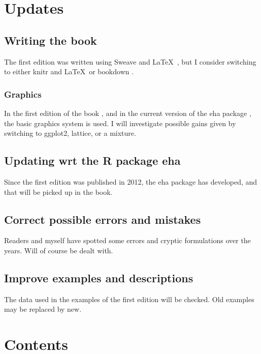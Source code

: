 \documentclass[a4paper,11pt]{article}
\begin{document}
\section{Updates} \label{sec:updates}

\subsection{Writing the book}

The first edition was written using Sweave \citep{sweave02} and \LaTeX\
\citep{lamport}, but I consider 
switching to either knitr \citep{knitr15} and \LaTeX\ or bookdown \citep{bookdown16}.

\subsubsection{Graphics}

In the first edition of the book \citep{ehar12}, and in the current version
of the eha package \citep{eha}, the basic graphics system is used. I will 
investigate possible gains given by switching to ggplot2, lattice, or a
mixture.


\subsection{Updating wrt the R package eha}

Since the first edition was published in 2012, the eha package has
developed, and that will be picked up in the book.

\subsection{Correct possible errors and mistakes}

Readers and myself have spotted some errors and cryptic formulations over
the years. Will of course be dealt with.

\subsection{Improve examples and descriptions}

The data used in the examples of the first edition will be checked. Old
examples may be replaced by new.  

\section{Contents} \label{sec:contents}
\end{document}
